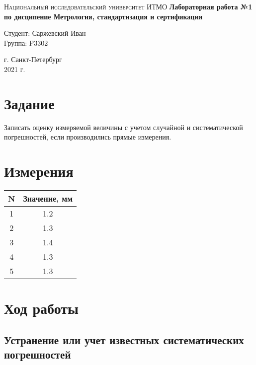 \documentclass[12pt, a4paper]{article}
\begin{document}
\begin{titlepage}
\begin{center}

\textsc{Национальный исследовательский университет ИТМО}
\vfill
\textbf{Лабораторная работа №1\\[4mm]
по дисципение Метрология, стандартизация и сертификация\\[16mm]
}
\begin{flushright}
Студент: Саржевский Иван
\\[2mm]Группа: P3302
\end{flushright}
\vfill
г. Санкт-Петербург\\[2mm]
2021 г.

\end{center}
\end{titlepage}

\section*{Задание}

Записать оценку измеряемой величины с учетом случайной и
систематической погрешностей, если производились прямые измерения.

\section*{Измерения}

\begin{center}
\begin{tabular}{|c|c|}
  \hline
  N & Значение, мм \\\hline
  1 & 1.2 \\\hline
  2 & 1.3 \\\hline
  3 & 1.4 \\\hline
  4 & 1.3 \\\hline
  5 & 1.3 \\\hline
\end{tabular}
\end{center}

\section*{Ход работы}

\subsection*{Устранение или учет известных систематических погрешностей}
\end{document}
